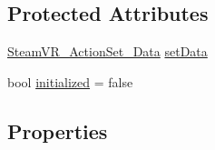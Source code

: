 \subsection*{Protected Attributes}
\begin{DoxyCompactItemize}
\item 
\mbox{\hyperlink{class_valve_1_1_v_r_1_1_steam_v_r___action_set___data}{Steam\+V\+R\+\_\+\+Action\+Set\+\_\+\+Data}} \mbox{\hyperlink{class_valve_1_1_v_r_1_1_steam_v_r___action_set_a4336152a003828c503e762b3d6bbc90e}{set\+Data}}
\item 
bool \mbox{\hyperlink{class_valve_1_1_v_r_1_1_steam_v_r___action_set_a7628464d8dcc5239d10705bd796999d1}{initialized}} = false
\end{DoxyCompactItemize}
\subsection*{Properties}
